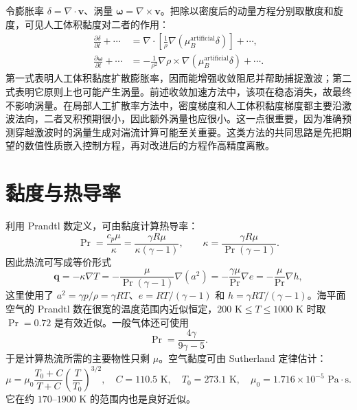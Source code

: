 \documentclass[11pt,a4paper,openany,fontset=none]{ctexbook}
\begin{document}
令膨胀率 $\delta=\nabla\cdot\bm v$、涡量 $\bm\omega=\nabla\times\bm v$。把除以密度后的动量方程分别取散度和旋度，可见人工体积黏度对二者的作用：
\begin{align}
 \frac{\partial\delta}{\partial t}+\cdots &=\nabla\cdot\left[
 \frac{1}{\rho}\nabla(\mu_B^{\mathrm{artificial}}\delta)\right]+\cdots, \tag{4.3.2}\\
 \frac{\partial\bm\omega}{\partial t}+\cdots &=-\frac{1}{\rho^2}\nabla\rho\times
 \nabla(\mu_B^{\mathrm{artificial}}\delta)+\cdots. \tag{4.3.3}
\end{align}
第一式表明人工体积黏度扩散膨胀率，因而能增强收敛阻尼并帮助捕捉激波；第二式表明它原则上也可能产生涡量。前述收敛加速方法中，该项在稳态消失，故最终不影响涡量。在局部人工扩散率方法中，密度梯度和人工体积黏度梯度都主要沿激波法向，二者叉积预期很小，因此额外涡量也应很小。这一点很重要，因为准确预测穿越激波时的涡量生成对湍流计算可能至关重要。这类方法的共同思路是先把期望的数值性质嵌入控制方程，再对改进后的方程作高精度离散。

\section{黏度与热导率}

利用 Prandtl 数定义，可由黏度计算热导率：
\begin{equation}
 \Pr=\frac{c_p\mu}{\kappa}=\frac{\gamma R\mu}{\kappa(\gamma-1)},
 \qquad \kappa=\frac{\gamma R\mu}{\Pr(\gamma-1)}. \tag{4.4.1}
\end{equation}
因此热流可写成等价形式
\begin{equation}
 \bm q=-\kappa\nabla T
 =-\frac{\mu}{\Pr(\gamma-1)}\nabla(a^2)
 =-\frac{\gamma\mu}{\Pr}\nabla e
 =-\frac{\mu}{\Pr}\nabla h, \tag{4.4.2}
\end{equation}
这里使用了 $a^2=\gamma p/\rho=\gamma RT$、$e=RT/(\gamma-1)$ 和 $h=\gamma RT/(\gamma-1)$。海平面空气的 Prandtl 数在很宽的温度范围内近似恒定，$200\text{ K}\le T\le1000\text{ K}$ 时取 $\Pr=0.72$ 是有效近似。一般气体还可使用
\begin{equation}
 \Pr=\frac{4\gamma}{9\gamma-5}. \tag{4.4.3}
\end{equation}
于是计算热流所需的主要物性只剩 $\mu$。空气黏度可由 Sutherland 定律估计：
\begin{equation}
 \mu=\mu_0\frac{T_0+C}{T+C}\left(\frac{T}{T_0}\right)^{3/2},
 \quad C=110.5\text{ K},\quad T_0=273.1\text{ K},\quad
 \mu_0=1.716\times10^{-5}\text{ Pa}\cdot\text{s}. \tag{4.4.4}
\end{equation}
它在约 $170$--$1900\text{ K}$ 的范围内也是良好近似。
\end{document}
